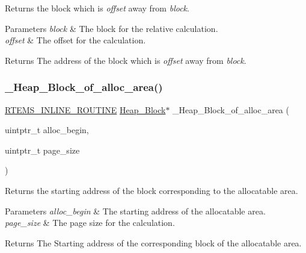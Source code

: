 Returns the block which is {\itshape offset} away from {\itshape block}. 


\begin{DoxyParams}{Parameters}
{\em block} & The block for the relative calculation. \\
\hline
{\em offset} & The offset for the calculation.\\
\hline
\end{DoxyParams}
\begin{DoxyReturn}{Returns}
The address of the block which is {\itshape offset} away from {\itshape block}. 
\end{DoxyReturn}
\mbox{\label{group__RTEMSScoreHeap_gafd70a7d05fc0c46a87ff68d759ab3af3}} 
\subsubsection{\texorpdfstring{\_Heap\_Block\_of\_alloc\_area()}{\_Heap\_Block\_of\_alloc\_area()}}
{\footnotesize\ttfamily \mbox{\hyperlink{group__RTEMSScoreBaseDefs_gac216239df231d5dbd15e3520b0b9313f}{R\+T\+E\+M\+S\+\_\+\+I\+N\+L\+I\+N\+E\+\_\+\+R\+O\+U\+T\+I\+NE}} \mbox{\hyperlink{structHeap__Block}{Heap\+\_\+\+Block}}$\ast$ \+\_\+\+Heap\+\_\+\+Block\+\_\+of\+\_\+alloc\+\_\+area (\begin{DoxyParamCaption}\item[{uintptr\+\_\+t}]{alloc\+\_\+begin,  }\item[{uintptr\+\_\+t}]{page\+\_\+size }\end{DoxyParamCaption})}



Returns the starting address of the block corresponding to the allocatable area. 


\begin{DoxyParams}{Parameters}
{\em alloc\+\_\+begin} & The starting address of the allocatable area. \\
\hline
{\em page\+\_\+size} & The page size for the calculation.\\
\hline
\end{DoxyParams}
\begin{DoxyReturn}{Returns}
The Starting address of the corresponding block of the allocatable area. 
\end{DoxyReturn}
\mbox{\label{group__RTEMSScoreHeap_gaf0c66d5f866002204674e2639575efc3}} 
